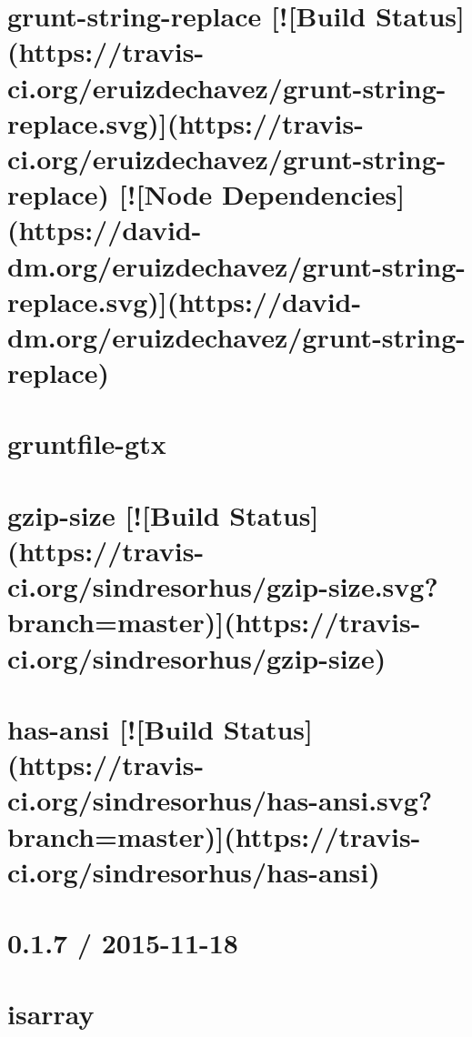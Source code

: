 \documentclass[twoside]{book}
\newcommand{\+}{\discretionary{\mbox{\scriptsize$\hookleftarrow$}}{}{}}
\begin{document}
\chapter{grunt-\/string-\/replace \mbox{[}!\mbox{[}Build Status\mbox{]}(https\+://travis-\/ci.org/eruizdechavez/grunt-\/string-\/replace.svg)\mbox{]}(https\+://travis-\/ci.org/eruizdechavez/grunt-\/string-\/replace) \mbox{[}!\mbox{[}Node Dependencies\mbox{]}(https\+://david-\/dm.org/eruizdechavez/grunt-\/string-\/replace.svg)\mbox{]}(https\+://david-\/dm.org/eruizdechavez/grunt-\/string-\/replace)}
\label{md_app_web_node_modules_grunt-string-replace__r_e_a_d_m_e}

\chapter{gruntfile-\/gtx}
\label{md_app_web_node_modules_gruntfile-gtx__r_e_a_d_m_e}

\chapter{gzip-\/size \mbox{[}!\mbox{[}Build Status\mbox{]}(https\+://travis-\/ci.org/sindresorhus/gzip-\/size.svg?branch=master)\mbox{]}(https\+://travis-\/ci.org/sindresorhus/gzip-\/size)}
\label{md_app_web_node_modules_gzip-size_readme}

\chapter{has-\/ansi \mbox{[}!\mbox{[}Build Status\mbox{]}(https\+://travis-\/ci.org/sindresorhus/has-\/ansi.svg?branch=master)\mbox{]}(https\+://travis-\/ci.org/sindresorhus/has-\/ansi)}
\label{md_app_web_node_modules_has-ansi_readme}

\chapter{0.1.7 / 2015-\/11-\/18}
\label{md_app_web_node_modules_has-binary__history}

\chapter{isarray}
\label{md_app_web_node_modules_has-binary_node_modules_isarray__r_e_a_d_m_e}

\end{document}
